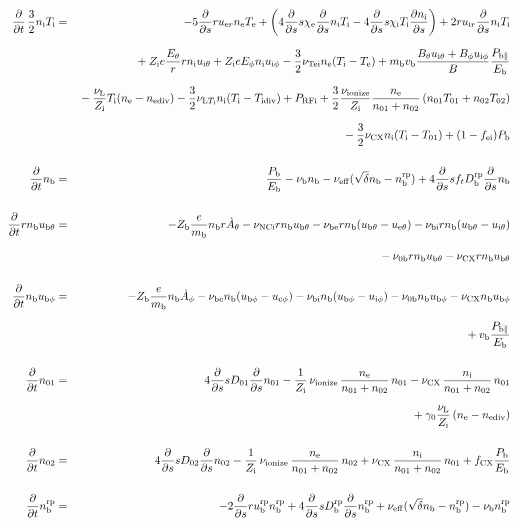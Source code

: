 \documentclass[11pt]{article}
\def\r#1{{\rm#1}}
\def\ddt{\frac{\partial}{\partial t}}
\def\dds{\frac{\partial}{\partial s}}
\def\dd#1{\frac{\partial #1}{\partial s}}
\def\mb{m_\r{b}}
\def\chie{\chi_\r{e}}
\def\chii{\chi_\r{i}}
\def\ne{n_\r{e}}
\def\ni{n_\r{i}}
\def\nb{n_\r{b}}
\def\uer{u_{\r{e}r}}
\def\uir{u_{\r{i}r}}
\def\ueth{u_{\r{e}\theta}}
\def\uith{u_{\r{i}\theta}}
\def\ubth{u_{\r{b}\theta}}
\def\ueph{u_{\r{e}\phi}}
\def\uiph{u_{\r{i}\phi}}
\def\ubph{u_{\r{b}\phi}}
\def\Eth{E_\theta}
\def\Eph{E_\phi}
\def\Bth{B_\theta}
\def\Bph{B_\phi}
\def\Athd{\dot{A}_\theta}
\def\Aphd{\dot{A}_\phi}
\def\Te{T_\r{e}}
\def\Ti{T_\r{i}}
\def\nna{n_{01}}
\def\nnb{n_{02}}
\def\Zi{Z_\r{i}}
\def\Zb{Z_\r{b}}
\def\Pb{P_\r{b}}
\def\Eb{E_\r{b}}
\def\PRFi{P_\r{RFi}}
\def\Tna{T_{01}}
\def\Tnb{T_{02}}
\def\fei{f_\r{ei}}
\def\nbrp{n_\r{b}^\r{rp}}
\def\Pbpara{P_{\r{b}\parallel}}
\def\nueff{\nu_\r{eff}}
\def\ubrp{u_\r{b}^\r{rp}}
\def\Dbrp{D_\r{b}^\r{rp}}
\def\fCX{f_\r{CX}}
\def\nuNCi{\nu_\r{NCi}}
\def\nube{\nu_\r{be}}
\def\nubi{\nu_\r{bi}}
\def\nunb{\nu_\r{0b}}
\def\nuL{\nu_\r{L}}
\def\nuCX{\nu_\r{CX}}
\def\nuion{\nu_\r{ionize}}
\def\nub{\nu_\r{b}}
\def\nuTei{\nu_\r{Tei}}
\def\vb{v_\r{b}}
\def\nediv{n_\r{ediv}}
\def\Tidiv{T_\r{idiv}}
\def\nuLTi{\nu_{\r{L}T_\r{i}}}
\begin{document}
\begin{eqnarray}
%
%
\\[5mm]
%
%
  \ddt \, \frac{3}{2} \ni \Ti &=&
%
  - 5 \dds r \uer \ne \Te
%
  + \left(   4 \dds s \chie \dds \ni \Ti 
%
           - 4 \dds s \chii \Ti \dd{\ni} \right)
%
  + 2 r \uir \dds \ni \Ti
%
\nonumber\\[2.5mm]&&{}
%
  + \Zi e \frac{\Eth}{r} r \ni \uith
%
  + \Zi e \Eph \ni \uiph
%
  - \frac{3}{2} \nuTei \ne (\Ti - \Te)
%
  + \mb \vb \frac{\Bth \uith + \Bph \uiph}{B} \frac{\Pbpara}{\Eb}  
\nonumber\\[2.5mm]&&{}
%
  - \frac{\nuL}{\Zi} \Ti (\ne - \nediv)
%
  - \frac{3}{2} \nuLTi \ni (\Ti - \Tidiv)
%
  + \PRFi
%
  + \frac{3}{2} \frac{\nuion}{\Zi} \frac{\ne}{\nna +\nnb}\, (\nna \Tna +
  \nnb \Tnb)
\nonumber\\[2.5mm]&&{}
%
  - \frac{3}{2} \nuCX \ni (\Ti - \Tna)
%
  + (1 - \fei) \Pb
\\[5mm]
%
%
  \ddt \nb &=&
%
    \frac{\Pb}{\Eb}
%
  - \nub \nb
%
  - \nueff (\sqrt{\delta}\nb - \nbrp)
%
  + 4 \dds s f_t \Dbrp \dds \nb
\\[5mm]
%
%
  \ddt r \nb \ubth &=&
%
  - \Zb \frac{e}{\mb} \nb r \Athd
%
  - \nuNCi r \nb \ubth
%
  - \nube r \nb (\ubth - \ueth)
%
  - \nubi r \nb (\ubth - \uith)
\nonumber\\[2.5mm]&&{}
%
  - \nunb r \nb \ubth
%
  - \nuCX r \nb \ubth
\\[5mm]
%
%
  \ddt \nb \ubph &=&
%
  - \Zb \frac{e}{\mb} \nb \Aphd
%
  - \nube \nb (\ubph - \ueph)
%
  - \nubi \nb (\ubph - \uiph)
%
  - \nunb \nb \ubph
%
  - \nuCX \nb \ubph
\nonumber\\[2.5mm]&&{}
%
  + \vb \frac{\Pbpara}{\Eb}
\\[5mm]
%
%
  \ddt \nna &=& 
%
    4 \dds s D_{01} \dds \nna
%
  - \frac{1}{\Zi}\, \nuion\, \frac{\ne}{\nna+\nnb}\, \nna
%
  - \nuCX\, \frac{\ni}{\nna+\nnb}\, \nna
\nonumber\\[2.5mm]&&{}
%
  + \gamma_0 \frac{\nuL}{\Zi} \, (\ne - \nediv)
\\[5mm]
%
%
  \ddt \nnb &=& 
%
    4 \dds s D_{02} \dds \nnb
%
  - \frac{1}{\Zi}\, \nuion\, \frac{\ne}{\nna+\nnb}\, \nnb
%
  + \nuCX\, \frac{\ni}{\nna+\nnb}\, \nna
%
  + \fCX \frac{\Pb}{\Eb}
\\[5mm]
%
%
  \ddt \nbrp &=&
%
  - 2 \dds r \ubrp \nbrp + 4 \dds s \Dbrp \dds \nbrp
%
  + \nueff (\sqrt{\delta} \nb - \nbrp)
%
  - \nub \nbrp
%
\end{eqnarray}
\end{document}
